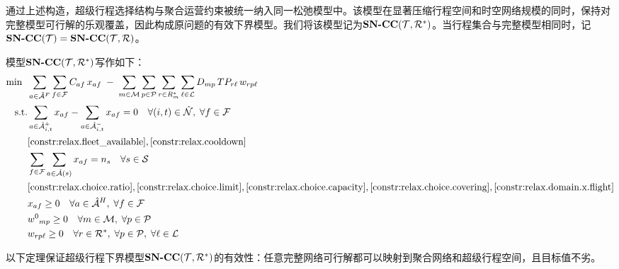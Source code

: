 通过上述构造，超级行程选择结构与聚合运营约束被统一纳入同一松弛模型中。该模型在显著压缩行程空间和时空网络规模的同时，保持对完整模型可行解的乐观覆盖，因此构成原问题的有效下界模型。我们将该模型记为$\textbf{SN-CC}({\mathcal{T}, \mathcal{R}^{*}})$。当行程集合与完整模型相同时，记$\textbf{SN-CC}({\mathcal{T}}) = \textbf{SN-CC}({\mathcal{T}, \mathcal{R}})$。

模型$\textbf{SN-CC}({\mathcal{T}, \mathcal{R}^{*}})$写作如下：
\begin{align}
    \min \;\; &
    \sum_{a\in \flightArc}\sum_{f\in \fleetSet} \cost_{af}\, \fleetAssignVar_{af}
    \;-\;
    \sum_{m\in \marketSet}\sum_{p\in \psgTypeSet}\sum_{r\in \itinSuperInMarket_{m}}\sum_{\ell\in \fareClassSet} 
    \demand_{mp}\,\fare_{r\ell}\, \shareVar_{rp\ell}
    \label{objfun:relax}
\\
    \text{s.t.} &
    \sum_{a\in \outArcSet{i,t}} \fleetAssignVar_{af} - \sum_{a\in \inArcSet{i,t}} \fleetAssignVar_{af} = 0 
    \quad \forall (i,t)\in \nodeSet,\; \forall f\in \fleetSet
    \label{constr:relax.flow}
\\&
    \eqref{constr:relax.fleet_available},
    \eqref{constr:relax.cooldown} \notag
\\&
    \sum_{f\in \fleetSet}\sum_{a\in \segArcSet{s}} \fleetAssignVar_{af} = \freq_{s}
    \quad \forall s\in \segSet
    \label{constr:relax.seg_freq}
\\&
    \eqref{constr:relax.choice.ratio},
    \eqref{constr:relax.choice.limit},
    \eqref{constr:relax.choice.capacity},
    \eqref{constr:relax.choice.covering},
    \eqref{constr:relax.domain.x.flight} \notag
\\&
    \fleetAssignVar_{af}\ge 0 \quad \forall a\in \holdingArc, \; \forall f\in \fleetSet
    \label{constr:relax.domain.x.holding}
\\&
    \outsideShareVar_{mp}\ge 0 \quad \forall m\in \marketSet, \; \forall p\in \psgTypeSet
    \label{constr:relax.domain.w.out}
\\&
    \shareVar_{rp\ell}\ge 0 \quad \forall r\in \itinSetSuper, \; \forall p\in \psgTypeSet, \; \forall \ell\in \fareClassSet
    \label{constr:relax.domain.w}
\end{align}

以下定理保证超级行程下界模型$\textbf{SN-CC}({\mathcal{T}, \mathcal{R}^{*}})$的有效性：任意完整网络可行解都可以映射到聚合网络和超级行程空间，且目标值不劣。


% 
% 
% 

